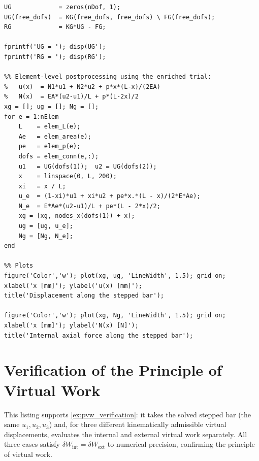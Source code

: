 \begin{lstlisting}[caption={Stepped bar with distributed and concentrated loads (Chapter~\ref{ch:1d})},
                   label={code:stepped_bar}]
UG             = zeros(nDof, 1);
UG(free_dofs)  = KG(free_dofs, free_dofs) \ FG(free_dofs);
RG             = KG*UG - FG;

fprintf('UG = '); disp(UG');
fprintf('RG = '); disp(RG');

%% Element-level postprocessing using the enriched trial:
%   u(x)  = N1*u1 + N2*u2 + p*x*(L-x)/(2EA)
%   N(x)  = EA*(u2-u1)/L + p*(L-2x)/2
xg = []; ug = []; Ng = [];
for e = 1:nElem
    L    = elem_L(e);
    Ae   = elem_area(e);
    pe   = elem_p(e);
    dofs = elem_conn(e,:);
    u1   = UG(dofs(1));  u2 = UG(dofs(2));
    x    = linspace(0, L, 200);
    xi   = x / L;
    u_e  = (1-xi)*u1 + xi*u2 + pe*x.*(L - x)/(2*E*Ae);
    N_e  = E*Ae*(u2-u1)/L + pe*(L - 2*x)/2;
    xg = [xg, nodes_x(dofs(1)) + x];
    ug = [ug, u_e];
    Ng = [Ng, N_e];
end

%% Plots
figure('Color','w'); plot(xg, ug, 'LineWidth', 1.5); grid on;
xlabel('x [mm]'); ylabel('u(x) [mm]');
title('Displacement along the stepped bar');

figure('Color','w'); plot(xg, Ng, 'LineWidth', 1.5); grid on;
xlabel('x [mm]'); ylabel('N(x) [N]');
title('Internal axial force along the stepped bar');
\end{lstlisting}

\section{Verification of the Principle of Virtual Work}
\label{lst:pvw_verification}

This listing supports \cref{ex:pvw_verification}: it takes the solved
stepped bar (the same $u_1, u_2, u_3$) and, for three different
kinematically admissible virtual displacements, evaluates the internal
and external virtual work separately. All three cases satisfy
$\delta W_{\mathrm{int}} = \delta W_{\mathrm{ext}}$ to numerical
precision, confirming the principle of virtual work.

